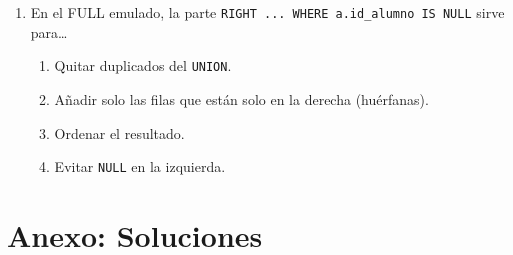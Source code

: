 \documentclass[11pt,a4paper]{article}
\begin{document}
\begin{enumerate}[label=\textbf{\arabic*.}]
\item En el FULL emulado, la parte \texttt{RIGHT ... WHERE a.id\_alumno IS NULL} sirve para…
  \begin{enumerate}[label=\Alph*.]
    \item Quitar duplicados del \texttt{UNION}.
    \item Añadir solo las filas que están solo en la derecha (huérfanas).
    \item Ordenar el resultado.
    \item Evitar \texttt{NULL} en la izquierda.
  \end{enumerate}
\end{enumerate}

\section*{Anexo: Soluciones}
\end{document}
